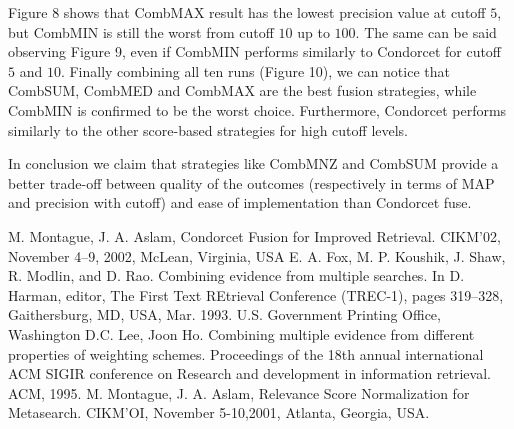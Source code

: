 \documentclass[letterpaper, 10 pt, conference]{ieeeconf}  %
\begin{document}
Figure 8 shows that CombMAX result has the lowest precision value at cutoff $5$, but CombMIN is still the worst from cutoff $10$ up to $100$. The same can be said observing Figure 9, even if CombMIN performs similarly to Condorcet for cutoff $5$ and $10$. Finally combining all ten runs (Figure 10), we can notice that CombSUM, CombMED and CombMAX are the best fusion strategies, while CombMIN is confirmed to be the worst choice. Furthermore, Condorcet performs similarly to the other score-based strategies for high cutoff levels.

In conclusion we claim that strategies like CombMNZ and CombSUM provide a better trade-off between quality of the outcomes (respectively in terms of MAP and precision with cutoff) and ease of implementation than Condorcet fuse.



\addtolength{\textheight}{-12cm}   %









\begin{thebibliography}{99}

 M. Montague, J. A. Aslam, Condorcet Fusion for Improved Retrieval. CIKM’02, November 4–9, 2002, McLean, Virginia, USA 
 E. A. Fox, M. P. Koushik, J. Shaw, R. Modlin, and
D. Rao. Combining evidence from multiple searches.
In D. Harman, editor, The First Text REtrieval
Conference (TREC-1), pages 319–328, Gaithersburg,
MD, USA, Mar. 1993. U.S. Government Printing
Office, Washington D.C.
 Lee, Joon Ho. Combining multiple evidence from different properties of weighting schemes. Proceedings
of the 18th annual international ACM SIGIR conference on Research and development in information retrieval. ACM, 1995.
 M. Montague, J. A. Aslam, Relevance Score Normalization for Metasearch. CIKM’OI, November 5-10,2001, Atlanta, Georgia, USA.
\end{thebibliography}
\end{document}
